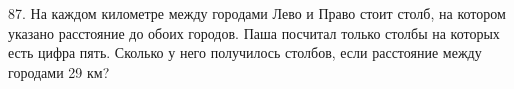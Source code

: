 87. На каждом километре между городами Лево и Право стоит столб, на котором указано расстояние до обоих городов. Паша посчитал только столбы на которых есть цифра пять. Сколько у него получилось столбов, если расстояние между городами 29 км?\\
